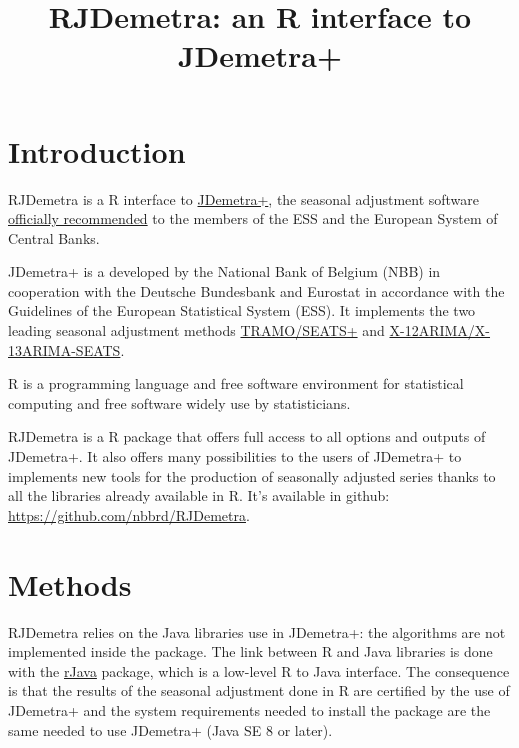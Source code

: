 \documentclass[]{article}
\title{RJDemetra: an R interface to JDemetra+}
\author{}
\date{}
\begin{document}
\maketitle

\section{Introduction}\label{introduction}

RJDemetra is a R interface to
\href{https://github.com/jdemetra/jdemetra-app}{JDemetra+}, the seasonal
adjustment software
\href{https://ec.europa.eu/eurostat/cros/system/files/Jdemetra_\%20release.pdf}{officially
recommended} to the members of the ESS and the European System of
Central Banks.

JDemetra+ is a developed by the National Bank of Belgium (NBB) in
cooperation with the Deutsche Bundesbank and Eurostat in accordance with
the Guidelines of the European Statistical System (ESS). It implements
the two leading seasonal adjustment methods
\href{http://www.bde.es/bde/en/secciones/servicios/Profesionales/Programas_estadi/Programas_estad_d9fa7f3710fd821.html}{TRAMO/SEATS+}
and
\href{https://www.census.gov/srd/www/x13as/}{X-12ARIMA/X-13ARIMA-SEATS}.

R is a programming language and free software environment for
statistical computing and free software widely use by statisticians.

RJDemetra is a R package that offers full access to all options and
outputs of JDemetra+. It also offers many possibilities to the users of
JDemetra+ to implements new tools for the production of seasonally
adjusted series thanks to all the libraries already available in R. It's
available in github: \url{https://github.com/nbbrd/RJDemetra}.

\section{Methods}\label{methods}

RJDemetra relies on the Java libraries use in JDemetra+: the algorithms
are not implemented inside the package. The link between R and Java
libraries is done with the
\href{https://CRAN.R-project.org/package=rJava}{rJava} package, which is
a low-level R to Java interface. The consequence is that the results of
the seasonal adjustment done in R are certified by the use of JDemetra+
and the system requirements needed to install the package are the same
needed to use JDemetra+ (Java SE 8 or later).
\end{document}
